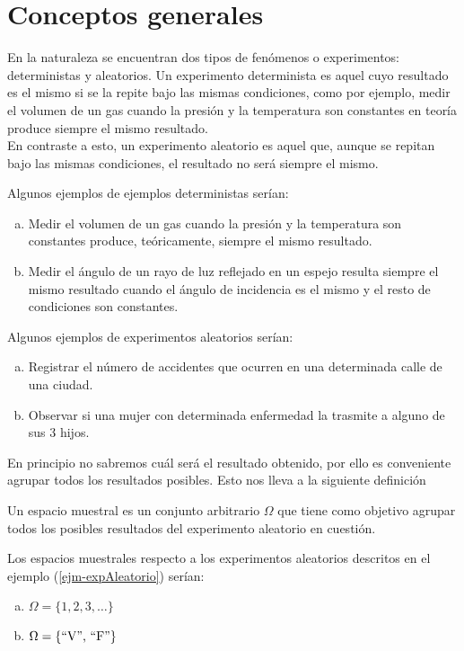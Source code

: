 \section{Conceptos generales}
    En la naturaleza se encuentran dos tipos de fenómenos o experimentos: deterministas y aleatorios. Un experimento determinista es aquel cuyo resultado es el mismo si se la repite bajo las mismas condiciones, como por ejemplo, medir el volumen de un gas cuando la presión y la temperatura son constantes en teoría produce siempre el mismo resultado.\\
    En contraste a esto, un experimento aleatorio es aquel que, aunque se repitan bajo las mismas condiciones, el resultado no será siempre el mismo.
\begin{Ejm}
    Algunos ejemplos de ejemplos deterministas serían:
    \begin{enumerate}[a)]
        \item Medir el volumen de un gas cuando la presión y la temperatura son constantes produce, teóricamente, siempre el mismo resultado.
        \item Medir el ángulo de un rayo de luz reflejado  en un espejo resulta siempre el mismo resultado cuando el ángulo de incidencia es el mismo y el resto de condiciones son constantes.
    \end{enumerate}
\end{Ejm}

\begin{Ejm}
    Algunos ejemplos de experimentos aleatorios serían:
    \begin{enumerate}[a)]
        \item Registrar el número de accidentes que ocurren en una determinada calle de una ciudad.
        \item Observar si una mujer con  determinada enfermedad la trasmite a alguno de sus 3 hijos. 
    \end{enumerate}
\end{Ejm}
En principio no sabremos cuál será el resultado obtenido, por ello es conveniente agrupar todos los resultados posibles. Esto nos lleva a la siguiente definición
\begin{Def}
Un espacio muestral es un conjunto arbitrario $\Omega$ que tiene como objetivo agrupar todos los posibles resultados del experimento aleatorio en cuestión.
\end{Def}
\begin{Ejm}
Los espacios muestrales respecto a los experimentos aleatorios descritos en el ejemplo (\ref{ejm-expAleatorio}) serían:
\begin{enumerate}[a)]
    \item $\Omega=\{1,2,3,\ldots\}$
    \item $\Omega=\{ \textnormal{\textquotedblleft V\textquotedblright, \textquotedblleft F\textquotedblright }\}$
\end{enumerate}
\end{Ejm}

